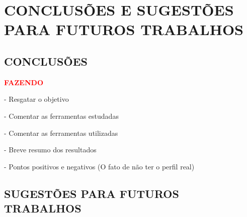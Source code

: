 \chapter{CONCLUSÕES E SUGESTÕES PARA FUTUROS TRABALHOS}\label{ch:conclusao}
\section{CONCLUSÕES} 
\textbf{\textcolor{red}{FAZENDO}}

- Resgatar o objetivo

- Comentar as ferramentas estudadas

- Comentar as ferramentas utilizadas

- Breve resumo dos resultados

- Pontos positivos e negativos (O fato de não ter o perfil real)


\section{SUGESTÕES PARA FUTUROS TRABALHOS}

%
